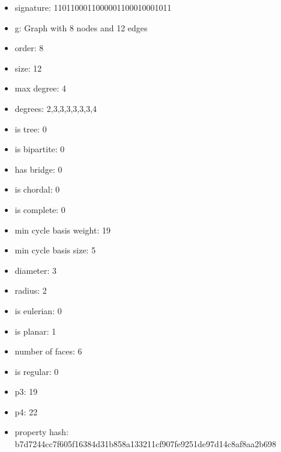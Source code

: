 \begin{itemize}
\item signature: 1101100011000001100010001011
\item g: Graph with 8 nodes and 12 edges
\item order: 8
\item size: 12
\item max degree: 4
\item degrees: 2,3,3,3,3,3,3,4
\item is tree: 0
\item is bipartite: 0
\item has bridge: 0
\item is chordal: 0
\item is complete: 0
\item min cycle basis weight: 19
\item min cycle basis size: 5
\item diameter: 3
\item radius: 2
\item is eulerian: 0
\item is planar: 1
\item number of faces: 6
\item is regular: 0
\item p3: 19
\item p4: 22
\item property hash: b7d7244cc7f605f16384d31b858a133211cf907fe9251de97d14c8af8aa2b698
\end{itemize}
\newpage
\begin{figure}
\end{figure}
